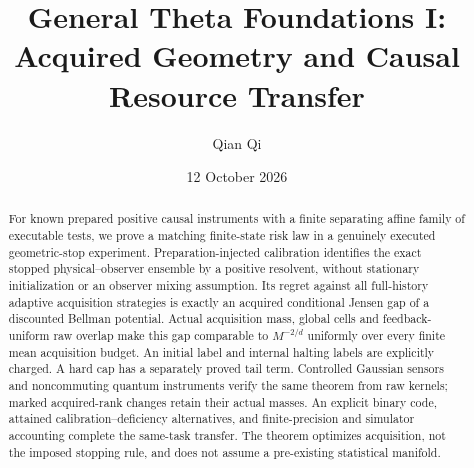 \documentclass[11pt]{amsart}
\title[General Theta Foundations I]{General Theta Foundations I:\\Acquired Geometry and Causal Resource Transfer}
\author{Qian Qi}\date{12 October 2026}
\theoremstyle{definition}\newtheorem{definition}[theorem]{Definition}
\theoremstyle{remark}\newtheorem{remark}[theorem]{Remark}
\begin{document}
\raggedbottom
\begin{abstract}
For known prepared positive causal instruments with a finite separating affine family of executable tests, we prove a matching finite-state risk law in a genuinely executed geometric-stop experiment. Preparation-injected calibration identifies the exact stopped physical--observer ensemble by a positive resolvent, without stationary initialization or an observer mixing assumption. Its regret against all full-history adaptive acquisition strategies is exactly an acquired conditional Jensen gap of a discounted Bellman potential. Actual acquisition mass, global cells and feedback-uniform raw overlap make this gap comparable to $M^{-2/d}$ uniformly over every finite mean acquisition budget. An initial label and internal halting labels are explicitly charged. A hard cap has a separately proved tail term. Controlled Gaussian sensors and noncommuting quantum instruments verify the same theorem from raw kernels; marked acquired-rank changes retain their actual masses. An explicit binary code, attained calibration--deficiency alternatives, and finite-precision and simulator accounting complete the same-task transfer. The theorem optimizes acquisition, not the imposed stopping rule, and does not assume a pre-existing statistical manifold.
\end{abstract}\maketitle










\appendix

\end{document}
